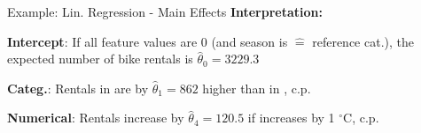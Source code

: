 \documentclass[10pt,compress,t,notes=noshow,xcolor=table]{beamer}
\begin{document}
\begin{framev}[align=top]{Example: Lin. Regression - Main Effects}
%
\textbf{Interpretation:}
\begin{itemizeM}
\item<+-> \textbf{Intercept}: If all feature values are 0 (and season is  $\hat =$ reference cat.), the expected number of bike rentals is $\hat\theta_0 = 3229.3$
\item<+-> \textbf{Categ.}: Rentals in  are by $\hat\theta_1 = 862$ higher than in , c.p.
\item<+-> \textbf{Numerical}: Rentals increase by $\hat\theta_4 = 120.5$ if  increases by 1 $^\circ$C, c.p.
\end{itemizeM}
\end{framev}

\endlecture
\end{document}

